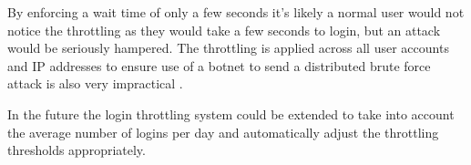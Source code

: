 By enforcing a wait time of only a few seconds  it's likely a normal user would not notice the throttling as they would take a few seconds to login, but an attack would be seriously hampered.
%
The throttling is applied across all user accounts and IP addresses to ensure use of a botnet to send a distributed brute force attack is also very impractical \parencite{stackoverflow2013authentication}.

In the future the login throttling system could be extended to take into account the average number of logins per day and automatically adjust the throttling thresholds appropriately.



